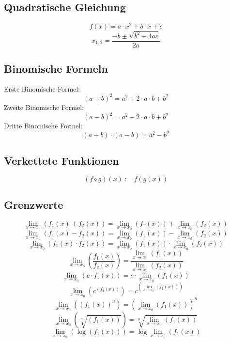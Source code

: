 \subsection{Quadratische Gleichung}
\[ \boxed{f(x) = a \cdot x^2 + b \cdot x + c} \]
\[ \boxed{x_{1,2}=\frac{-b\pm\sqrt{b^2-4ac}}{2a}} \]

\subsection{Binomische Formeln}
Erste Binomische Formel: 
\[ \boxed{(a + b)^2 = a^2 + 2 \cdot a \cdot b + b^2} \]Zweite Binomische Formel: 
\[ \boxed{(a - b)^2 = a^2 - 2 \cdot a \cdot b + b^2} \]Dritte Binomische Formel: 
\[ \boxed{(a + b) \cdot (a - b) = a^2 - b^2} \]

\subsection{Verkettete Funktionen}
\[ \boxed{(f \circ g)(x) := f(g(x))} \]

\subsection{Grenzwerte}
\[ \boxed{\lim\limits_{x \to x_0}(f_1(x) + f_2(x)) = \lim\limits_{x \to x_0}(f_1(x)) + \lim\limits_{x \to x_0}(f_2(x))} \]
\[ \boxed{\lim\limits_{x \to x_0}(f_1(x) - f_2(x)) = \lim\limits_{x \to x_0}(f_1(x)) - \lim\limits_{x \to x_0}(f_2(x))} \]
\[ \boxed{\lim\limits_{x \to x_0}(f_1(x) \cdot f_2(x)) = \lim\limits_{x \to x_0}(f_1(x)) \cdot \lim\limits_{x \to x_0}(f_2(x))} \]
\[ \boxed{\lim\limits_{x \to x_0}\left(\frac{f_1(x)}{f_2(x)}\right) = \frac{\lim\limits_{x \to x_0}(f_1(x))}{\lim\limits_{x \to x_0}(f_2(x))}} \]
\[ \boxed{\lim\limits_{x \to x_0}(c \cdot f_1(x)) = c \cdot \lim\limits_{x \to x_0}(f_1(x))} \]
\[ \boxed{\lim\limits_{x \to x_0}\left(c^{(f_1(x))}\right) = c^{\left(\lim\limits_{x \to x_0}(f_1(x))\right)}} \]
\[ \boxed{\lim\limits_{x \to x_0}\left((f_1(x))^n\right) = \left(\lim\limits_{x \to x_0}(f_1(x))\right)^n} \]
\[ \boxed{\lim\limits_{x \to x_0}\left(\sqrt[n]{(f_1(x))}\right) = \sqrt[n]{\lim\limits_{x \to x_0}(f_1(x))}} \]
\[ \boxed{\lim\limits_{x \to x_0}\left(\log{(f_1(x))}\right) = \log{\lim\limits_{x \to x_0}(f_1(x))}} \]

